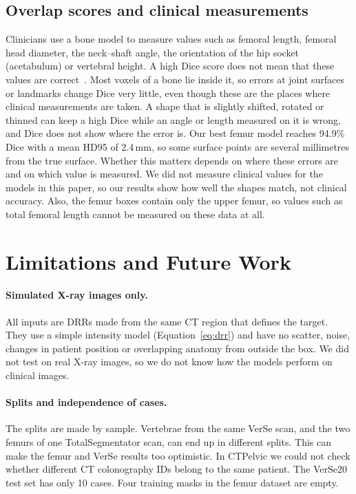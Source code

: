 \documentclass[11pt]{article}
\begin{document}
\subsection{Overlap scores and clinical measurements}\label{sec:clinical}
Clinicians use a bone model to measure values such as femoral length, femoral head diameter, the neck--shaft angle, the orientation of the hip socket (acetabulum) or vertebral height. A high Dice score does not mean that these values are correct~\cite{taha2015,maierhein2024}. Most voxels of a bone lie inside it, so errors at joint surfaces or landmarks change Dice very little, even though these are the places where clinical measurements are taken. A shape that is slightly shifted, rotated or thinned can keep a high Dice while an angle or length measured on it is wrong, and Dice does not show where the error is. Our best femur model reaches 94.9\% Dice with a mean HD95 of 2.4\,mm, so some surface points are several millimetres from the true surface. Whether this matters depends on where these errors are and on which value is measured. We did not measure clinical values for the models in this paper, so our results show how well the shapes match, not clinical accuracy. Also, the femur boxes contain only the upper femur, so values such as total femoral length cannot be measured on these data at all.

\section{Limitations and Future Work}\label{sec:limitations}

\paragraph{Simulated X-ray images only.}
All inputs are DRRs made from the same CT region that defines the target. They use a simple intensity model (Equation~\ref{eq:drr}) and have no scatter, noise, changes in patient position or overlapping anatomy from outside the box. We did not test on real X-ray images, so we do not know how the models perform on clinical images.

\paragraph{Splits and independence of cases.}
The splits are made by sample. Vertebrae from the same VerSe scan, and the two femurs of one TotalSegmentator scan, can end up in different splits. This can make the femur and VerSe results too optimistic. In CTPelvic we could not check whether different CT colonography IDs belong to the same patient. The VerSe20 test set has only 10 cases. Four training masks in the femur dataset are empty.
\end{document}
